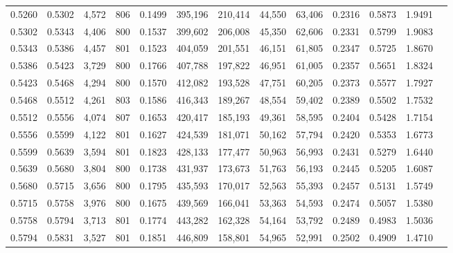 \begin{tabular}{rrrrrrrrrrrrr}
0.5260 & 0.5302 &  4,572 & 806 &                                     0.1499 & 395,196 & 210,414 &  44,550 &  63,406 & 0.2316 & 0.5873 & 1.9491 \\
0.5302 & 0.5343 &  4,406 & 800 &                                     0.1537 & 399,602 & 206,008 &  45,350 &  62,606 & 0.2331 & 0.5799 & 1.9083 \\
0.5343 & 0.5386 &  4,457 & 801 &                                     0.1523 & 404,059 & 201,551 &  46,151 &  61,805 & 0.2347 & 0.5725 & 1.8670 \\
0.5386 & 0.5423 &  3,729 & 800 &                                     0.1766 & 407,788 & 197,822 &  46,951 &  61,005 & 0.2357 & 0.5651 & 1.8324 \\
0.5423 & 0.5468 &  4,294 & 800 &                                     0.1570 & 412,082 & 193,528 &  47,751 &  60,205 & 0.2373 & 0.5577 & 1.7927 \\
0.5468 & 0.5512 &  4,261 & 803 &                                     0.1586 & 416,343 & 189,267 &  48,554 &  59,402 & 0.2389 & 0.5502 & 1.7532 \\
0.5512 & 0.5556 &  4,074 & 807 &                                     0.1653 & 420,417 & 185,193 &  49,361 &  58,595 & 0.2404 & 0.5428 & 1.7154 \\
0.5556 & 0.5599 &  4,122 & 801 &                                     0.1627 & 424,539 & 181,071 &  50,162 &  57,794 & 0.2420 & 0.5353 & 1.6773 \\
0.5599 & 0.5639 &  3,594 & 801 &                                     0.1823 & 428,133 & 177,477 &  50,963 &  56,993 & 0.2431 & 0.5279 & 1.6440 \\
0.5639 & 0.5680 &  3,804 & 800 &                                     0.1738 & 431,937 & 173,673 &  51,763 &  56,193 & 0.2445 & 0.5205 & 1.6087 \\
0.5680 & 0.5715 &  3,656 & 800 &                                     0.1795 & 435,593 & 170,017 &  52,563 &  55,393 & 0.2457 & 0.5131 & 1.5749 \\
0.5715 & 0.5758 &  3,976 & 800 &                                     0.1675 & 439,569 & 166,041 &  53,363 &  54,593 & 0.2474 & 0.5057 & 1.5380 \\
0.5758 & 0.5794 &  3,713 & 801 &                                     0.1774 & 443,282 & 162,328 &  54,164 &  53,792 & 0.2489 & 0.4983 & 1.5036 \\
0.5794 & 0.5831 &  3,527 & 801 &                                     0.1851 & 446,809 & 158,801 &  54,965 &  52,991 & 0.2502 & 0.4909 & 1.4710 \\

\end{tabular}
